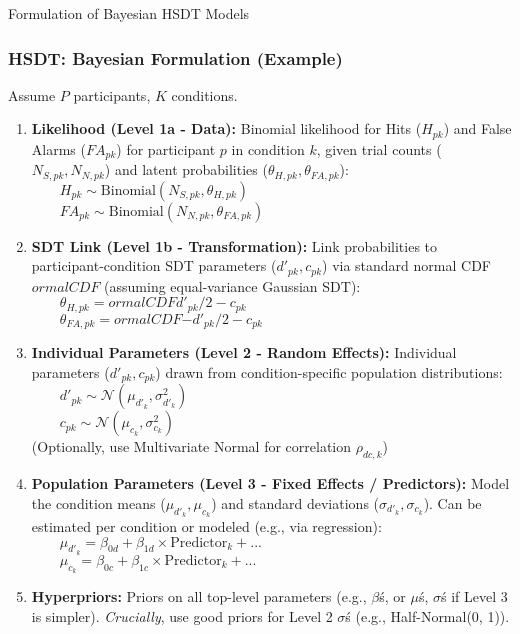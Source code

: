 \documentclass[aspectratio=169]{beamer}
\begin{document}
\begin{frame}[fragile]{Formulation of Bayesian HSDT Models}
    \frametitle{HSDT: Bayesian Formulation (Example)}
    Assume $P$ participants, $K$ conditions.
    \footnotesize %
    \begin{enumerate}
        \item \textbf{Likelihood (Level 1a - Data):}
            Binomial likelihood for Hits ($H_{pk}$) and False Alarms ($FA_{pk}$) for participant $p$ in condition $k$, given trial counts ($N_{S,pk}, N_{N,pk}$) and latent probabilities ($\theta_{H,pk}, \theta_{FA,pk}$):
            $ \qquad H_{pk} \sim \text{Binomial}(N_{S, pk}, \theta_{H, pk}) $\\[-1ex]
            $ \qquad FA_{pk} \sim \text{Binomial}(N_{N, pk}, \theta_{FA, pk}) $
        \pause
        \item \textbf{SDT Link (Level 1b - Transformation):}
            Link probabilities to participant-condition SDT parameters ($d'_{pk}, c_{pk}$) via standard normal CDF $
ormalCDF{}$ (assuming equal-variance Gaussian SDT):
            $ \qquad \theta_{H, pk} = 
ormalCDF{d'_{pk}/2 - c_{pk}} $\\[-1ex]
            $ \qquad \theta_{FA, pk} = 
ormalCDF{-d'_{pk}/2 - c_{pk}} $
        \pause
        \item \textbf{Individual Parameters (Level 2 - Random Effects):}
            Individual parameters ($d'_{pk}, c_{pk}$) drawn from condition-specific population distributions:
            $ \qquad d'_{pk} \sim \mathcal{N}(\mu_{d'_k}, \sigma^2_{d'_k}) $\\[-1ex]
            $ \qquad c_{pk} \sim \mathcal{N}(\mu_{c_k}, \sigma^2_{c_k}) $\\[-0.5ex]
            (Optionally, use Multivariate Normal for correlation $\rho_{dc,k}$)
        \pause
        \item \textbf{Population Parameters (Level 3 - Fixed Effects / Predictors):}
            Model the condition means ($\mu_{d'_k}, \mu_{c_k}$) and standard deviations ($\sigma_{d'_k}, \sigma_{c_k}$). Can be estimated per condition or modeled (e.g., via regression):
            $ \qquad \mu_{d'_k} = \beta_{0d} + \beta_{1d} \times \text{Predictor}_k + ... $\\[-1ex]
            $ \qquad \mu_{c_k} = \beta_{0c} + \beta_{1c} \times \text{Predictor}_k + ... $
        \pause
        \item \textbf{Hyperpriors:}
            Priors on all top-level parameters (e.g., $\beta$\'s, or $\mu$\'s, $\sigma$\'s if Level 3 is simpler). \emph{Crucially}, use good priors for Level 2 $\sigma$\'s (e.g., Half-Normal(0, 1)).
    \end{enumerate}
\end{frame}
\end{document}
